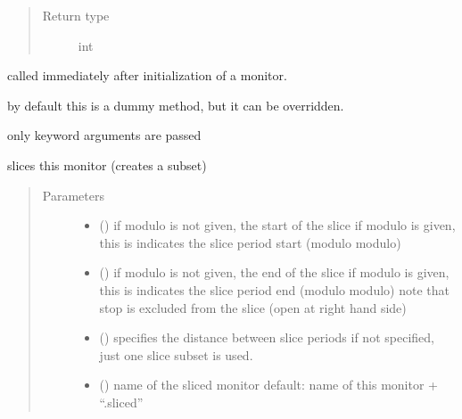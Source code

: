 \documentclass[letterpaper,10pt,english]{sphinxmanual}
\begin{document}
\begin{fulllineitems}
\begin{fulllineitems}
\begin{quote}
\begin{description}
\item[{Return type}] \leavevmode
int

\end{description}\end{quote}

\end{fulllineitems}


\begin{fulllineitems}
\label{\detokenize{Reference:salabim.Monitor.setup}}
called immediately after initialization of a monitor.

by default this is a dummy method, but it can be overridden.

only keyword arguments are passed

\end{fulllineitems}


\begin{fulllineitems}
\label{\detokenize{Reference:salabim.Monitor.slice}}
slices this monitor (creates a subset)
\begin{quote}\begin{description}
\item[{Parameters}] \leavevmode\begin{itemize}
\item {} 
 () \textendash{} if modulo is not given, the start of the slice 
if modulo is given, this is indicates the slice period start (modulo modulo)

\item {} 
 () \textendash{} if modulo is not given, the end of the slice 
if modulo is given, this is indicates the slice period end (modulo modulo) 
note that stop is excluded from the slice (open at right hand side)

\item {} 
 () \textendash{} specifies the distance between slice periods 
if not specified, just one slice subset is used.

\item {} 
 () \textendash{} name of the sliced monitor 
default: name of this monitor + “.sliced”


\end{itemize}
\end{description}
\end{quote}
\end{fulllineitems}
\end{fulllineitems}
\end{document}
